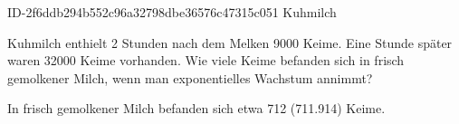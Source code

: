 \begin{exercise}
      {ID-2f6ddb294b552c96a32798dbe36576c47315c051}
      {Kuhmilch}
  \ifproblem\problem\par
     Kuhmilch enthielt 2 Stunden nach dem Melken \num{9000}
    Keime. Eine Stunde später waren \num{32000} Keime vorhanden. Wie
    viele Keime befanden sich in  frisch gemolkener Milch,
    wenn man exponentielles Wachstum annimmt?
  \fi
  \ifoutcome\outcome\par
    In  frisch gemolkener Milch befanden sich
    etwa \num{712} (\num{711.914}) Keime.
  \fi
\end{exercise}

